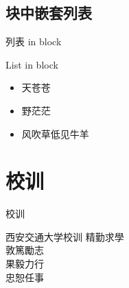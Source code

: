 \documentclass{ctexbeamer}
\begin{document}
\subsection{块中嵌套列表}

\begin{frame}{列表 in block}
  \begin{exampleblock}{List in block}
    \begin{itemize}
      \item 天苍苍
      \item 野茫茫
      \item 风吹草低见牛羊
    \end{itemize}
  \end{exampleblock}
\end{frame}

\section{校训}

\begin{frame}{校训}

    \begin{block}{西安交通大学校训}
        \centering\Huge
        精勤求學\\ \pause
        敦篤勵志\\ \pause
        果毅力行\\ \pause
        忠恕任事
    \end{block}

\end{frame}
\end{document}
